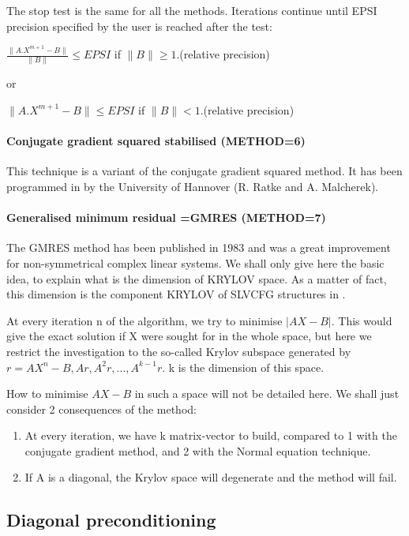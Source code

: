 The stop test is the same for all the methods. Iterations continue until EPSI
precision specified by the user is reached after the test:

$\frac{\lVert{A.X^{m+1}-B}\rVert}{\lVert{B}\rVert} \leq EPSI$
if $\lVert{B}\rVert \ge 1.$(relative precision)

or

$\lVert{A.X^{m+1}-B}\rVert \leq EPSI$ if $\lVert{B}\rVert < 1.$(relative precision)

\paragraph{Conjugate gradient squared stabilised (METHOD=6)}

This technique is a variant of the conjugate gradient squared
method. It has been programmed in \bief by the University of Hannover (R. Ratke
and A. Malcherek).

\paragraph{Generalised minimum residual =GMRES (METHOD=7)}

The GMRES method has been published in 1983 and was a great improvement for
non-symmetrical complex linear systems. We shall only give here the basic idea,
to explain what is the dimension of KRYLOV space. As a matter of fact, this
dimension is the component KRYLOV of SLVCFG structures in \bief.

At every iteration n of the algorithm, we try to minimise $\left|AX-B\right|$.
This would give the exact solution if X were sought for in the whole space, but
here we restrict the investigation to the so-called Krylov subspace generated
by $r = AX^{n} - B, Ar, A^{2}r, ..., A^{k-1}r$. k is the dimension of this space.

How to minimise $AX-B$ in such a space will not be detailed here. We shall just
consider 2 consequences of the method:

\begin{enumerate}
  \item At every iteration, we have k matrix-vector to build, compared to 1
    with the conjugate gradient method, and 2 with the Normal
    equation technique.
  \item If A is a diagonal, the Krylov space will degenerate and the method
    will fail.
\end{enumerate}

\subsection{Diagonal preconditioning}

